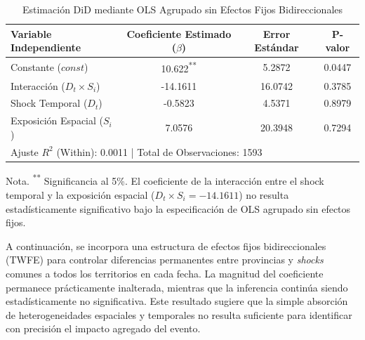 \begin{table}[H]
    \centering
    \caption{Estimaci\'on DiD mediante OLS Agrupado sin Efectos Fijos Bidireccionales}
    \label{tab:did_simple}
    \small
    \begin{tabular}{lccc}
        \toprule
        Variable Independiente & Coeficiente Estimado ($\beta$) & Error Est\'andar & P-valor \\
        \midrule
        Constante ($const$)             & 10.622\textsuperscript{**}   & 5.2872   & 0.0447  \\
        Interacci\'on ($D_t \times S_i$) & -14.1611                     & 16.0742  & 0.3785  \\
        Shock Temporal ($D_t$)          & -0.5823                      & 4.5371   & 0.8979  \\
        Exposici\'on Espacial ($S_i$)   & 7.0576                       & 20.3948  & 0.7294  \\
        \midrule
        \multicolumn{4}{l}{\small Ajuste $R^2$ (Within): 0.0011 \quad | \quad Total de Observaciones: 1593} \\
        \bottomrule
    \end{tabular}
    \vspace{0.1cm}
    \begin{flushleft}
    \small{Nota. \textsuperscript{**} Significancia al 5\%. El coeficiente de la interacci\'on entre el shock temporal y la exposici\'on espacial ($D_t \times S_i = -14.1611$) no resulta estad\'isticamente significativo bajo la especificaci\'on de OLS agrupado sin efectos fijos.}
    \end{flushleft}
\end{table}
\vspace{0.2cm}

A continuaci\'on, se incorpora una estructura de efectos fijos bidireccionales (TWFE) para controlar diferencias permanentes entre provincias y \textit{shocks} comunes a todos los territorios en cada fecha. La magnitud del coeficiente permanece pr\'acticamente inalterada, mientras que la inferencia contin\'ua siendo estad\'isticamente no significativa. Este resultado sugiere que la simple absorci\'on de heterogeneidades espaciales y temporales no resulta suficiente para identificar con precisi\'on el impacto agregado del evento.

